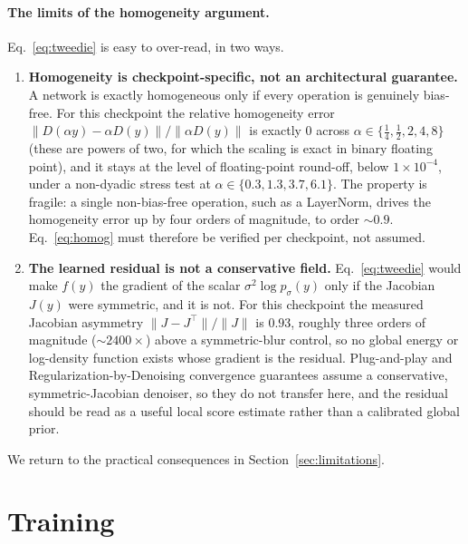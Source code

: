 \documentclass{article}
\begin{document}
\paragraph{The limits of the homogeneity argument.}
\label{sec:theory-limits}
Eq.~\eqref{eq:tweedie} is easy to over-read, in two ways.
\begin{enumerate}
  \item \textbf{Homogeneity is checkpoint-specific, not an architectural guarantee.} A network is exactly homogeneous only if every operation is genuinely bias-free. For this checkpoint the relative homogeneity error $\lVert D(\alpha y)-\alpha D(y)\rVert / \lVert \alpha D(y)\rVert$ is exactly $0$ across $\alpha \in \{\tfrac14,\tfrac12,2,4,8\}$ (these are powers of two, for which the scaling is exact in binary floating point), and it stays at the level of floating-point round-off, below $1\times10^{-4}$, under a non-dyadic stress test at $\alpha \in \{0.3,1.3,3.7,6.1\}$. The property is fragile: a single non-bias-free operation, such as a LayerNorm, drives the homogeneity error up by four orders of magnitude, to order $\sim\!0.9$. Eq.~\eqref{eq:homog} must therefore be verified per checkpoint, not assumed.
  \item \textbf{The learned residual is not a conservative field.} Eq.~\eqref{eq:tweedie} would make $f(y)$ the gradient of the scalar $\sigma^2 \log p_\sigma(y)$ only if the Jacobian $J(y)$ were symmetric, and it is not. For this checkpoint the measured Jacobian asymmetry $\lVert J - J^\top\rVert / \lVert J\rVert$ is $0.93$, roughly three orders of magnitude ($\sim\!2400\times$) above a symmetric-blur control, so no global energy or log-density function exists whose gradient is the residual. Plug-and-play and Regularization-by-Denoising convergence guarantees assume a conservative, symmetric-Jacobian denoiser, so they do not transfer here, and the residual should be read as a useful local score estimate rather than a calibrated global prior.
\end{enumerate}
We return to the practical consequences in Section~\ref{sec:limitations}.

\clearpage
\section{Training}
\label{sec:training}
\end{document}
